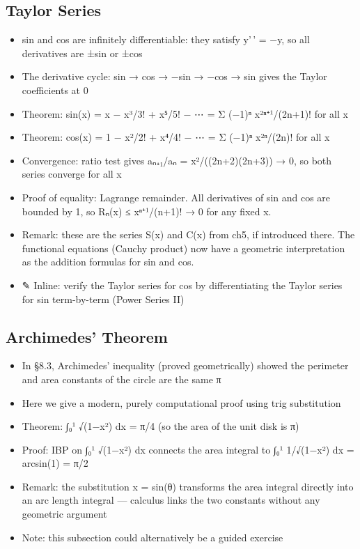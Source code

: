 \documentclass[
  10pt,
  letterpaper,
]{scrbook}
\providecommand{\tightlist}{%
  \setlength{\itemsep}{0pt}\setlength{\parskip}{0pt}}
\begin{document}
\subsection{Taylor Series}\label{taylor-series}

\begin{itemize}
\tightlist
\item
  sin and cos are infinitely differentiable: they satisfy y'\,' = −y, so
  all derivatives are ±sin or ±cos
\item
  The derivative cycle: sin → cos → −sin → −cos → sin gives the Taylor
  coefficients at 0
\item
  Theorem: sin(x) = x − x³/3! + x⁵/5! − ⋯ = Σ (−1)ⁿ x²ⁿ⁺¹/(2n+1)! for
  all x
\item
  Theorem: cos(x) = 1 − x²/2! + x⁴/4! − ⋯ = Σ (−1)ⁿ x²ⁿ/(2n)! for all x
\item
  Convergence: ratio test gives \textbar aₙ₊₁/aₙ\textbar{} =
  \textbar x\textbar²/((2n+2)(2n+3)) → 0, so both series converge for
  all x
\item
  Proof of equality: Lagrange remainder. All derivatives of sin and cos
  are bounded by 1, so \textbar Rₙ(x)\textbar{} ≤
  \textbar x\textbar ⁿ⁺¹/(n+1)! → 0 for any fixed x.
\item
  Remark: these are the series S(x) and C(x) from ch5, if introduced
  there. The functional equations (Cauchy product) now have a geometric
  interpretation as the addition formulas for sin and cos.
\item
  ✎ Inline: verify the Taylor series for cos by differentiating the
  Taylor series for sin term-by-term (Power Series II)
\end{itemize}

\subsection{Archimedes' Theorem}\label{archimedes-theorem}

\begin{itemize}
\tightlist
\item
  In §8.3, Archimedes' inequality (proved geometrically) showed the
  perimeter and area constants of the circle are the same π
\item
  Here we give a modern, purely computational proof using trig
  substitution
\item
  Theorem: ∫₀¹ √(1−x²) dx = π/4 (so the area of the unit disk is π)
\item
  Proof: IBP on ∫₀¹ √(1−x²) dx connects the area integral to ∫₀¹
  1/√(1−x²) dx = arcsin(1) = π/2
\item
  Remark: the substitution x = sin(θ) transforms the area integral
  directly into an arc length integral --- calculus links the two
  constants without any geometric argument
\item
  Note: this subsection could alternatively be a guided exercise
\end{itemize}
\end{document}
